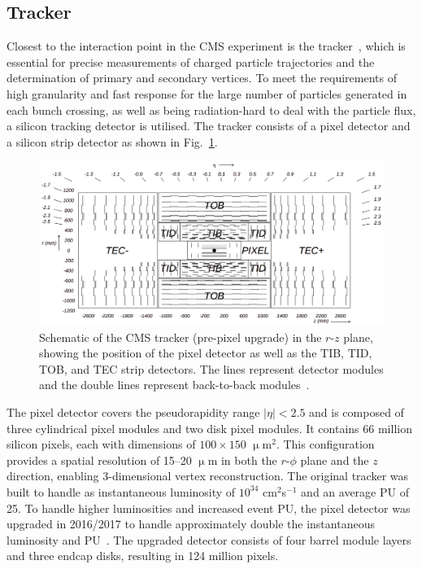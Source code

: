 \subsection{Tracker}

Closest to the interaction point in the \ac{CMS} experiment is the tracker~\cite{CMS_Setup,Malberti:2014pda,CMS:2012sda}, which is essential for precise measurements of charged particle trajectories and the determination of primary and secondary vertices. 
To meet the requirements of high granularity and fast response for the large number of particles generated in each bunch crossing, as well as being radiation-hard to deal with the particle flux, a silicon tracking detector is utilised. 
The tracker consists of a pixel detector and a silicon strip detector as shown in Fig.~\ref{fig:tracker}. \\

\begin{figure}[!hbtp]
    \centering
    \includegraphics[width=\textwidth]{Figures/tracker.png}
    \caption{Schematic of the CMS tracker (pre-pixel upgrade) in the $r$-$z$ plane, showing the position of the pixel detector as well as the TIB, TID, TOB, and TEC strip detectors. The lines represent detector modules and the double lines represent back-to-back modules~\cite{CMS_Setup}.}
    \label{fig:tracker}
\end{figure}

The pixel detector covers the pseudorapidity range $|\eta| < 2.5$ and is composed of three cylindrical pixel modules and two disk pixel modules. 
It contains 66 million silicon pixels, each with dimensions of $100 \times 150$ $\upmu$m${^2}$. 
This configuration provides a spatial resolution of 15--20 $\upmu$m in both the $r$-$\phi$ plane and the $z$ direction, enabling 3-dimensional vertex reconstruction.
The original tracker was built to handle as instantaneous luminosity of $10^{34}$ cm$^{2}$s$^{-1}$ and an average \ac{PU} of 25.
To handle higher luminosities and increased event \ac{PU}, the pixel detector was upgraded in 2016/2017 to handle approximately double the instantaneous luminosity and \ac{PU}~\cite{CMS:2012sda}. 
The upgraded detector consists of four barrel module layers and three endcap disks, resulting in 124 million pixels. \\

